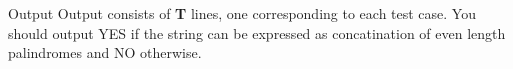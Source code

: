 Output
Output consists of   \textbf{    T   }   lines, one corresponding to each test case. You should output   YES   if the string can be expressed as concatination of even length palindromes and   NO   otherwise.